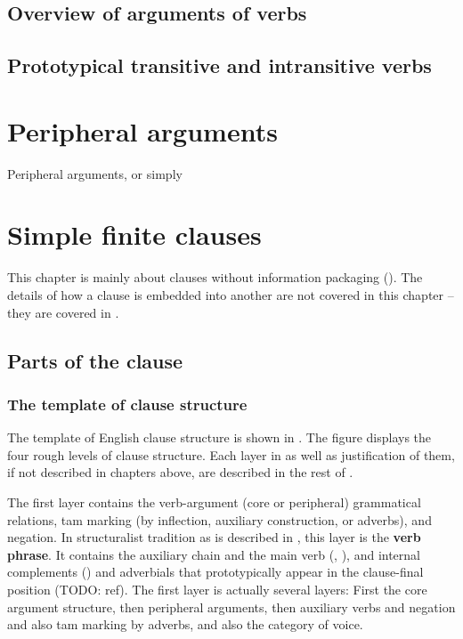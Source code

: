 \documentclass[UTF8, a4paper, oneside, scheme=plain]{ctexrep}
\newcommand*{\concept}[1]{\textbf{#1}}
\begin{document}
\section{Overview of arguments of verbs}\label{sec:valency.overview}

\section{Prototypical transitive and intransitive verbs}



\chapter{Peripheral arguments}\label{sec:peripheral-arguments}

Peripheral arguments, or simply 

\chapter{Simple finite clauses}\label{chap:simple-clause}

This chapter is mainly about clauses 
without information packaging ().
The details of how a clause is embedded into another are not covered in this chapter
-- they are covered in .

\section{Parts of the clause}\label{sec:simple-clause.overview}

\subsection{The template of clause structure}\label{sec:clause-template}

The template of English clause structure is shown in .
The figure displays the four rough levels of clause structure.
Each layer in  as well as justification of them,
if not described in chapters above, are described 
in the rest of .

The first layer contains the verb-argument (core or peripheral) grammatical relations,
\ac{tam} marking (by inflection, auxiliary construction, or adverbs), and negation.
In structuralist tradition as is described in \citet{cgel},
this layer is the \concept{verb phrase}.
It contains the auxiliary chain and the main verb 
(, ),
and internal complements ()
and adverbials that prototypically appear in the clause-final position (TODO: ref).
The first layer is actually several layers:
First the core argument structure,
then peripheral arguments, 
then auxiliary verbs and negation and also \acs{tam} marking by adverbs,
and also the category of voice. 
\end{document}
